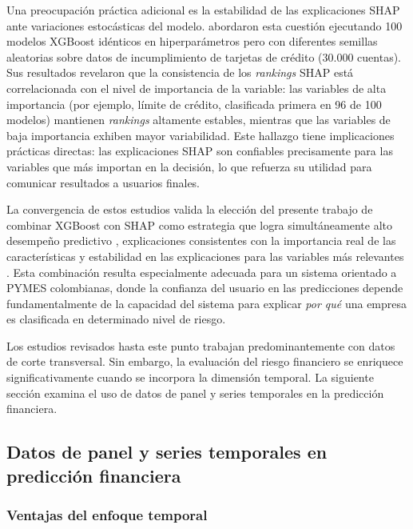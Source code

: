 \documentclass[12pt, letterpaper]{article}
\begin{document}
Una preocupaci\'on pr\'actica adicional es la estabilidad de las explicaciones SHAP ante variaciones estoc\'asticas del modelo. \citet{Lin2024} abordaron esta cuesti\'on ejecutando 100 modelos XGBoost id\'enticos en hiperpar\'ametros pero con diferentes semillas aleatorias sobre datos de incumplimiento de tarjetas de cr\'edito (30.000 cuentas). Sus resultados revelaron que la consistencia de los \textit{rankings} SHAP est\'a correlacionada con el nivel de importancia de la variable: las variables de alta importancia (por ejemplo, l\'imite de cr\'edito, clasificada primera en 96 de 100 modelos) mantienen \textit{rankings} altamente estables, mientras que las variables de baja importancia exhiben mayor variabilidad. Este hallazgo tiene implicaciones pr\'acticas directas: las explicaciones SHAP son confiables precisamente para las variables que m\'as importan en la decisi\'on, lo que refuerza su utilidad para comunicar resultados a usuarios finales.

La convergencia de estos estudios valida la elecci\'on del presente trabajo de combinar XGBoost con SHAP como estrategia que logra simult\'aneamente alto desempe\~no predictivo \citep{Dasilas2024, Bussmann2020}, explicaciones consistentes con la importancia real de las caracter\'isticas \citep{Pathi2025} y estabilidad en las explicaciones para las variables m\'as relevantes \citep{Lin2024}. Esta combinaci\'on resulta especialmente adecuada para un sistema orientado a PYMES colombianas, donde la confianza del usuario en las predicciones depende fundamentalmente de la capacidad del sistema para explicar \textit{por qu\'e} una empresa es clasificada en determinado nivel de riesgo.

Los estudios revisados hasta este punto trabajan predominantemente con datos de corte transversal. Sin embargo, la evaluaci\'on del riesgo financiero se enriquece significativamente cuando se incorpora la dimensi\'on temporal. La siguiente secci\'on examina el uso de datos de panel y series temporales en la predicci\'on financiera.

\subsection{Datos de panel y series temporales en predicci\'on financiera}
\label{sec:panel}

\subsubsection{Ventajas del enfoque temporal}
\end{document}
